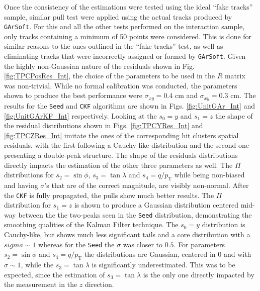 Once the consistency of the estimations were tested using the ideal \enquote{fake tracks} sample, similar pull test were applied using the actual tracks produced by \texttt{GArSoft}. For this and all the other tests performed on the interaction sample, only tracks containing a minimum of 50 points were considered. This is done for similar reasons to the ones outlined in the \enquote{fake tracks} test, as well as eliminating tracks that were incorrectly assigned or formed by \texttt{GArSoft}.  Given the highly non-Gaussian nature of the residuals shown in Fig. \ref{fig:TPCPosRes_Int}, the choice of the parameters to be used in the $R$ matrix was non-trivial. While no formal calibration was conducted, the parameters shown to produce the best performance were $\sigma_{xy}=0.4$ cm and $\sigma_{xy}=0.3$ cm. The results for the \texttt{Seed} and \texttt{CKF} algorithms are shown in Figs. \ref{fig:UnitGAr_Int} and \ref{fig:UnitGArKF_Int} respectively. Looking at the $s_0=y$ and $s_1=z$ the shape of the residual distributions shown in Figs. \ref{fig:TPCYRes_Int} and \ref{fig:TPCZRes_Int} imitate the ones of the corresponding hit clusters spatial residuals, with the first following a Cauchy-like distribution and the second one presenting a double-peak structure. The shape of the residuals distributions directly impacts the estimation of the other three parameters as well. The $\Pi$ distributions for $s_2=\sin\phi$, $s_3=\tan\lambda$ and $s_4=q/p_\textrm{T}$ while being non-biased and having $\sigma$'s that are of the correct magnitude, are visibly non-normal. After the \texttt{CKF} is fully propagated, the pulls show much better results. The $\Pi$ distribution for $s_1=z$ is shown to produce a Gaussian distribution centered mid-way between the the two-peaks seen in the \texttt{Seed} distribution, demonstrating the smoothing qualities of the Kalman Filter technique. The $s_0=y$ distribution is Cauchy-like, but shows much less significant tails and a core distribution with a $sigma \sim 1$ whereas for the \texttt{Seed} the $\sigma$ was closer to $0.5$. For parameters $s_2=\sin\phi$ and $s_4=q/p_\textrm{T}$ the distributions are Gaussian, centered in 0 and with $\sigma\sim 1$, while the $s_3=\tan\lambda$ is significantly underestimated. This was to be expected, since the estimation of $s_3=\tan\lambda$ is the only one directly impacted by the measurement in the $z$ direction.

